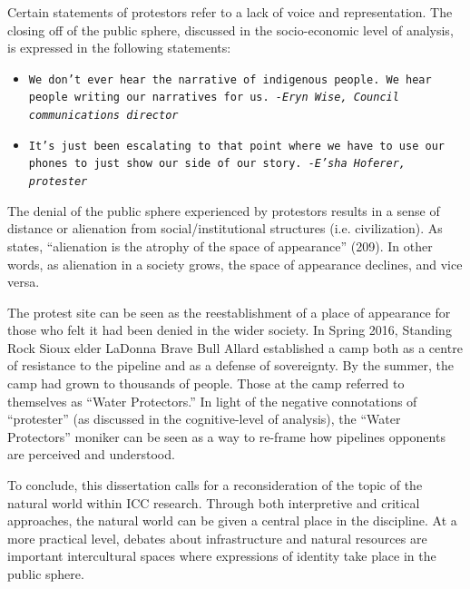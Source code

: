 Certain statements of protestors refer to a lack of voice and representation. The closing off of the public sphere, discussed in the socio-economic level of analysis, is expressed in the following statements:   

\begin{footnotesize}
\begin{itemize}
\item[] \texttt{We don't ever hear the narrative of indigenous people. We hear people writing our narratives for us.\newline 
\textit{-Eryn Wise, Council communications director}}
\newline
\item[] \texttt{It's just been escalating to that point where we have to use our phones to just show our side of our story. \newline 
\textit{-E'sha Hoferer, protester}}
\end{itemize}
\end{footnotesize} 

The denial of the public sphere experienced by protestors results in a sense of distance or alienation from social/institutional structures (i.e. civilization). As \cite*{Arendt1958a} states, ``alienation is the atrophy of the space of appearance'' (209). In other words, as alienation in a society grows, the space of appearance declines, and vice versa.

The protest site can be seen as the reestablishment of a place of appearance for those who felt it had been denied in the wider society. In Spring 2016, Standing Rock Sioux elder LaDonna Brave Bull Allard established a camp both as a centre of resistance to the pipeline and as a defense of sovereignty. By the summer, the camp had grown to thousands of people. Those at the camp referred to themselves as ``Water Protectors.'' In light of the negative connotations of ``protester'' (as discussed in the cognitive-level of analysis), the ``Water Protectors'' moniker can be seen as a way to re-frame how pipelines opponents are perceived and understood. 

To conclude, this dissertation calls for a reconsideration of the topic of the natural world within ICC research. Through both interpretive and critical approaches, the natural world can be given a central place in the discipline. At a more practical level, debates about infrastructure and natural resources are important intercultural spaces where expressions of identity take place in the public sphere. 

